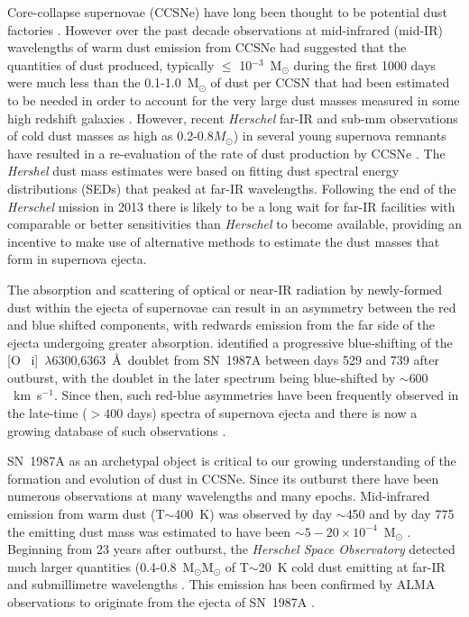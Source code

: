 \documentclass[useAMS,usenatbib,usegraphicx]{mnras}
\begin{document}
Core-collapse supernovae (CCSNe) have long been thought to be potential 
dust factories \citep{Hoyle1970, Kozasa1991, Todini2001}. However 
over the past decade observations at mid-infrared (mid-IR) wavelengths of 
warm dust emission from CCSNe had suggested that the quantities of dust 
produced, typically $\leq$ 10$^{-3}$~M$_\odot$ during the first 1000 days 
\citep{Sugerman2006, Meikle2007, Kotak2009, Andrews2010, Fabbri2011} were 
much less than the 0.1-1.0~M$_\odot$ of dust per CCSN that had been 
estimated to be needed \citep{Morgan2003, Dwek2007} in order to account 
for the very large dust masses measured in some high redshift galaxies 
\citep{Omont2001, Bertoldi2003, Watson2015}. However, recent {\em 
Herschel} far-IR and sub-mm observations of cold dust masses as high as 
0.2-0.8$M_{\odot}$) in several young supernova remnants have resulted in a 
re-evaluation of the rate of dust production by CCSNe \citep{Barlow2010, 
Matsuura2011, Gomez2012}. The {\em Hershel} dust mass estimates were based 
on fitting dust spectral energy distributions (SEDs) that peaked at far-IR 
wavelengths. Following the end of the {\em Herschel} mission in 
2013 there is likely to be a long wait for far-IR facilities with 
comparable or better sensitivities than {\em Herschel} to become 
available, providing an incentive to make use of alternative methods to 
estimate the dust masses that form in supernova ejecta.


The absorption and scattering of optical or near-IR radiation by 
newly-formed dust within the ejecta of supernovae can result in an 
asymmetry between the red and blue shifted components, with redwards 
emission from the far side of the ejecta undergoing greater absorption. 
\citet{Lucy1989} identified a progressive blue-shifting of the [O~{\sc 
i}]~$\lambda$6300,6363~\AA\ doublet from SN~1987A between days 529 and 739 
after outburst, with the doublet in the later spectrum being blue-shifted 
by $\sim 600 $~km~s$^{-1}$. Since then, such red-blue asymmetries have 
been frequently observed in the late-time ($ > 400$ days) spectra of 
supernova ejecta and there is now a growing database of such observations 
\citep{Lucy1989,Fabbri2011,Mauerhan2012,Milisavljevic2012}.

SN~1987A as an archetypal object is critical to our growing understanding 
of the formation and evolution of dust in CCSNe.  Since its outburst there 
have been numerous observations at many wavelengths and many epochs. 
Mid-infrared emission from warm dust (T$\sim$400~K) was observed by day 
$\sim$450 \citep{Roche1989, Bouchet1991, Wooden1993} and by day 775 the 
emitting dust mass was estimated to have been 
$\sim5-20\times10^{-4}$~M$_\odot$ \citep{Wooden1993, Ercolano2007, 
Wesson2015}. Beginning from 23 years after outburst, the {\em Herschel 
Space Observatory} detected much larger quantities 
(0.4-0.8~M$_\odot$M$_\odot$ of T$\sim$20~K cold dust emitting at far-IR 
and submillimetre wavelengths \citep{Matsuura2011, Matsuura2015}. This 
emission has been confirmed by ALMA observations to originate from the 
ejecta of SN~1987A \citep{Indebetouw2014}.
\end{document}
